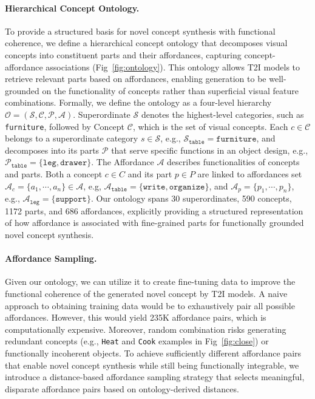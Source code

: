 \paragraph{Hierarchical Concept Ontology.}
To provide a structured basis for novel concept synthesis with functional coherence, we define a hierarchical concept ontology that decomposes visual concepts into constituent parts and their affordances, capturing concept-affordance associations (Fig~\ref{fig:ontology}). This ontology allows T2I models to retrieve relevant parts based on affordances, enabling generation to be well-grounded on the functionality of concepts rather than superficial visual feature combinations. Formally, we define the ontology as a four-level hierarchy $\mathcal{O} = (\mathcal{S}, \mathcal{C}, \mathcal{P}, \mathcal{A})$. Superordinate $\mathcal{S}$ denotes the highest-level categories, such as \texttt{furniture}, followed by Concept $\mathcal{C}$, which is the set of visual concepts. Each $c \in \mathcal{C}$ belongs to a superordinate category $s \in \mathcal{S}$, e.g., $\mathcal{S}_\texttt{table} = \texttt{furniture}$, and decomposes into its parts $\mathcal{P}$ that serve specific functions in an object design, e.g., $\mathcal{P}_{\texttt{table}} = \{\texttt{leg}, \texttt{drawer}\}$. The Affordance $\mathcal{A}$ describes functionalities of concepts and parts. Both a concept $c \in C$ and its part $p \in P$ are linked to affordances set $\mathcal{A}_c = \{a_1, \cdots, a_n\} \in \mathcal{A}$, e.g, $\mathcal{A}_{\texttt{table}} = \{\texttt{write}, \texttt{organize}\}$, and $\mathcal{A}_p = \{p_1, \cdots, p_n\}$, e.g., $\mathcal{A}_{\texttt{leg}} = \{\texttt{support}\}$. Our ontology spans 30 superordinates, 590 concepts, 1172 parts, and 686 affordances, explicitly providing a structured representation of how affordance is associated with fine-grained parts for functionally grounded novel concept synthesis.

\paragraph{Affordance Sampling.}
\label{sec:affor-sampling}
Given our ontology, we can utilize it to create fine-tuning data to improve the functional coherence of the generated novel concept by T2I models. A naive approach to obtaining training data would be to exhaustively pair all possible affordances. 
However, this would yield 235K affordance pairs, which is computationally expensive. Moreover, random combination risks generating redundant concepts (e.g., \texttt{Heat} and \texttt{Cook} examples in Fig~\ref{fig:close}) or functionally incoherent objects. To achieve sufficiently different affordance pairs that enable novel concept synthesis while still being functionally integrable, we introduce a distance-based affordance sampling strategy that selects meaningful, disparate affordance pairs based on ontology-derived distances.

